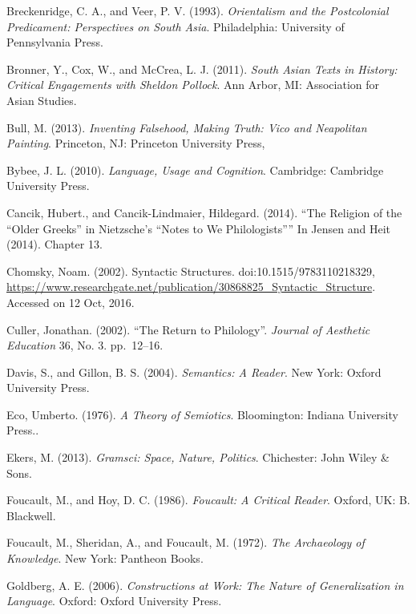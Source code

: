 \begin{thebibliography}{99}
 Breckenridge, C. A., and Veer, P. V. (1993). \textit{Orientalism and the Postcolonial Predicament: Perspectives on South Asia}. Philadelphia: University of Pennsylvania Press.

  Bronner, Y., Cox, W., and McCrea, L. J. (2011). \textit{South Asian Texts in History: Critical Engagements with Sheldon Pollock}. Ann Arbor, MI: Association for Asian Studies.

  Bull, M. (2013). \textit{Inventing Falsehood, Making Truth: Vico and Neapolitan Painting}. Princeton, NJ: Princeton University Press,

  Bybee, J. L. (2010). \textit{Language, Usage and Cognition}. Cambridge: Cambridge University Press.

  Cancik, Hubert., and Cancik-Lindmaier, Hildegard. (2014). “The Religion of the “Older Greeks” in Nietzsche’s “Notes to We Philologists”” In Jensen and Heit (2014). Chapter 13.

  Chomsky, Noam. (2002). Syntactic Structures. doi:10.1515/9783110218329, \url{https://www.researchgate.net/publication/30868825_Syntactic_Structure}. Accessed on 12 Oct, 2016.

  Culler, Jonathan. (2002). “The Return to Philology”. \textit{Journal of Aesthetic Education} 36, No. 3. pp.~12--16.

  Davis, S., and Gillon, B. S. (2004). \textit{Semantics: A Reader}. New York: Oxford University Press.

  Eco, Umberto. (1976). \textit{A Theory of Semiotics}. Bloomington: Indiana University Press..

  Ekers, M. (2013). \textit{Gramsci: Space, Nature, Politics}. Chichester: John Wiley \& Sons.

  Foucault, M., and Hoy, D. C. (1986). \textit{Foucault: A Critical Reader}. Oxford, UK: B. Blackwell.

  Foucault, M., Sheridan, A., and Foucault, M. (1972). \textit{The Archaeology of Knowledge}. New York: Pantheon Books.

  Goldberg, A. E. (2006). \textit{Constructions at Work: The Nature of Generalization in Language}. Oxford: Oxford University Press.


\end{thebibliography}
